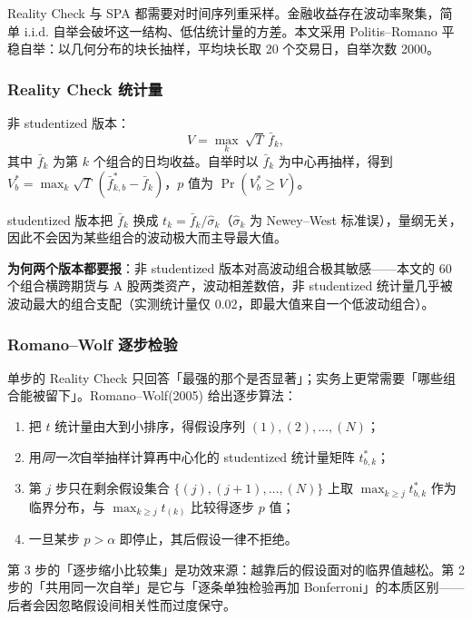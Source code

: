 Reality Check 与 SPA 都需要对时间序列重采样。金融收益存在波动率聚集，简单 i.i.d. 自举会破坏这一结构、低估统计量的方差。本文采用 Politis--Romano 平稳自举：以几何分布的块长抽样，平均块长取 20 个交易日，自举次数 2000。

\subsubsection*{Reality Check 统计量}

非 studentized 版本：
\begin{equation}
V=\max_k\ \sqrt{T}\,\bar f_k ,
\end{equation}
其中 $\bar f_k$ 为第 $k$ 个组合的日均收益。自举时以 $\bar f_k$ 为中心再抽样，得到 $V^*_b=\max_k\sqrt T\,(\bar f^{*}_{k,b}-\bar f_k)$，$p$ 值为 $\Pr(V^*_b\ge V)$。

studentized 版本把 $\bar f_k$ 换成 $t_k=\bar f_k/\hat\sigma_k$（$\hat\sigma_k$ 为 Newey--West 标准误），量纲无关，因此不会因为某些组合的波动极大而主导最大值。

\textbf{为何两个版本都要报}：非 studentized 版本对高波动组合极其敏感——本文的 $60$ 个组合横跨期货与 A 股两类资产，波动相差数倍，非 studentized 统计量几乎被波动最大的组合支配（实测统计量仅 $0.02$，即最大值来自一个低波动组合）。

\subsubsection*{Romano--Wolf 逐步检验}

单步的 Reality Check 只回答「最强的那个是否显著」；实务上更常需要「哪些组合能被留下」。Romano--Wolf(2005) 给出逐步算法\cite{romanowolf2005}：

\begin{enumerate}[leftmargin=2.2em]
  \item 把 $t$ 统计量由大到小排序，得假设序列 $(1),(2),\dots,(N)$；
  \item 用\emph{同一次}自举抽样计算再中心化的 studentized 统计量矩阵 $t^*_{b,k}$；
  \item 第 $j$ 步只在剩余假设集合 $\{(j),(j+1),\dots,(N)\}$ 上取
        $\max_{k\ge j}t^*_{b,k}$ 作为临界分布，与 $\max_{k\ge j}t_{(k)}$ 比较得逐步 $p$ 值；
  \item 一旦某步 $p>\alpha$ 即停止，其后假设一律不拒绝。
\end{enumerate}

第 3 步的「逐步缩小比较集」是功效来源：越靠后的假设面对的临界值越松。第 2 步的「共用同一次自举」是它与「逐条单独检验再加 Bonferroni」的本质区别——后者会因忽略假设间相关性而过度保守。

